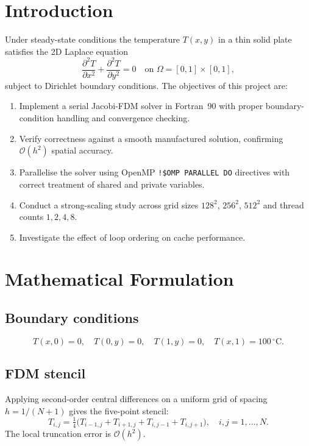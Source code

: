 \documentclass[12pt,a4paper]{article}
\begin{document}
\tableofcontents\newpage

\section{Introduction}

Under steady-state conditions the temperature $T(x,y)$ in a thin solid plate
satisfies the 2D Laplace equation
\begin{equation}
  \frac{\partial^2 T}{\partial x^2}+\frac{\partial^2 T}{\partial y^2}=0
  \quad\text{on }\Omega=[0,1]\times[0,1],
  \label{eq:laplace}
\end{equation}
subject to Dirichlet boundary conditions. The objectives of this project are:
\begin{enumerate}[noitemsep]
  \item Implement a serial Jacobi-FDM solver in Fortran~90 with proper
        boundary-condition handling and convergence checking.
  \item Verify correctness against a smooth manufactured solution, confirming
        $\mathcal{O}(h^2)$ spatial accuracy.
  \item Parallelise the solver using OpenMP \texttt{!\$OMP PARALLEL DO}
        directives with correct treatment of shared and private variables.
  \item Conduct a strong-scaling study across grid sizes $128^2$, $256^2$,
        $512^2$ and thread counts $1,2,4,8$.
  \item Investigate the effect of loop ordering on cache performance.
\end{enumerate}

\section{Mathematical Formulation}

\subsection{Boundary conditions}
\begin{equation}
  T(x,0)=0,\quad T(0,y)=0,\quad T(1,y)=0,\quad T(x,1)=100\,^\circ\text{C}.
\end{equation}

\subsection{FDM stencil}
Applying second-order central differences on a uniform grid of spacing
$h=1/(N+1)$ gives the five-point stencil:
\begin{equation}
  \boxed{T_{i,j}=\tfrac{1}{4}\bigl(T_{i-1,j}+T_{i+1,j}+T_{i,j-1}
  +T_{i,j+1}\bigr),\quad i,j=1,\ldots,N.}
  \label{eq:stencil}
\end{equation}
The local truncation error is $\mathcal{O}(h^2)$.
\end{document}
